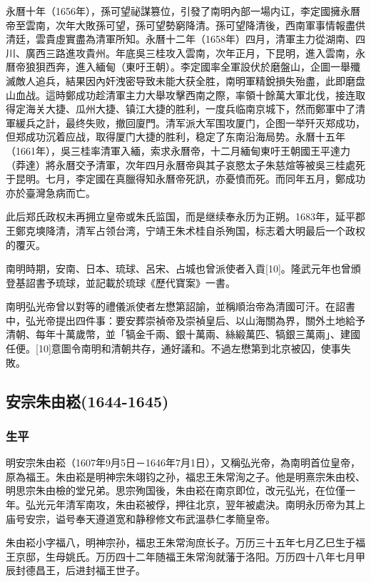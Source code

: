 永曆十年（1656年），孫可望祕謀篡位，引發了南明內部一場内讧，李定國擁永曆帝至雲南，次年大敗孫可望，孫可望勢窮降清。孫可望降清後，西南軍事情報盡供清廷，雲貴虛實盡為清軍所知。永曆十二年（1658年）四月，清軍主力從湖南、四川、廣西三路進攻貴州。年底吳三桂攻入雲南，次年正月，下昆明，進入雲南，永曆帝狼狽西奔，進入緬甸（東吁王朝）。李定國率全軍設伏於磨盤山，企圖一舉殲滅敵人追兵，結果因內奸洩密导致未能大获全胜，南明軍精銳損失殆盡，此即磨盘山血战。這時鄭成功趁清軍主力大舉攻擊西南之際，率領十餘萬大軍北伐，接连取得定海关大捷、瓜州大捷、镇江大捷的胜利，一度兵临南京城下，然而鄭軍中了清軍緩兵之計，最终失败，撤回廈門。清军派大军围攻厦门，企图一举歼灭郑成功，但郑成功沉着应战，取得厦门大捷的胜利，稳定了东南沿海局势。永曆十五年（1661年），吳三桂率清軍入緬，索求永曆帝，十二月緬甸東吁王朝國王平達力（莽達）將永曆交予清軍，次年四月永曆帝與其子哀愍太子朱慈煊等被吳三桂處死于昆明。七月，李定國在真臘得知永曆帝死訊，亦憂憤而死。而同年五月，鄭成功亦於臺灣急病而亡。

此后郑氏政权未再拥立皇帝或朱氏监国，而是继续奉永历为正朔。1683年，延平郡王鄭克塽降清，清军占领台湾，宁靖王朱术桂自杀殉国，标志着大明最后一个政权的覆灭。

南明時期，安南、日本、琉球、呂宋、占城也曾派使者入貢[10]。隆武元年也曾頒登基詔書予琉球，並記載於琉球《歷代寶案》一書。

南明弘光帝曾以對等的禮儀派使者左懋第詔諭，並稱順治帝為清國可汗。在詔書中，弘光帝提出四件事：要安葬崇禎帝及崇禎皇后、以山海關為界，關外土地給予清朝、每年十萬歲幣，並「犒金千兩、銀十萬兩、絲緞萬匹、犒銀三萬兩」、建國任便。[10]意圖令南明和清朝共存，通好議和。不過左懋第到北京被囚，使事失敗。

\subsection{安宗朱由崧\tiny(1644-1645)}

\subsubsection{生平}

明安宗朱由崧（1607年9月5日－1646年7月1日），又稱弘光帝，為南明首位皇帝，原為福王。朱由崧是明神宗朱翊钧之孙，福忠王朱常洵之子。他是明熹宗朱由校、明思宗朱由檢的堂兄弟。思宗殉国後，朱由崧在南京即位，改元弘光，在位僅一年。弘光元年清军南攻，朱由崧被俘，押往北京，翌年被處決。南明永历帝为其上庙号安宗，谥号奉天遵道宽和静穆修文布武溫恭仁孝簡皇帝。

朱由崧小字福八，明神宗孙，福忠王朱常洵庶长子。万历三十五年七月乙巳生于福王京邸，生母姚氏。万历四十二年随福王朱常洵就藩于洛阳。万历四十八年七月甲辰封德昌王，后进封福王世子。

